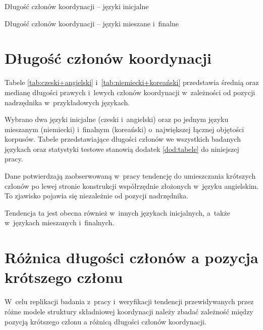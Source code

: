 

\begin{table}[H]
\centering
\resizebox{\linewidth}{!}{

\quad

}
\caption{Długość członów koordynacji -- języki inicjalne}
\label{tab:czeski+angielski}
\end{table}

\begin{table}[H]
\centering
\resizebox{\linewidth}{!}{

\quad

}
\caption{Długość członów koordynacji -- języki mieszane i~finalne}
\label{tab:niemiecki+koreański}
\end{table}

\section{Długość członów koordynacji}

Tabele \ref{tab:czeski+angielski} i~\ref{tab:niemiecki+koreański} przedstawia średnią oraz medianę długości prawych i~lewych członów koordynacji w~zależności od pozycji nadrzędnika w~przykładowych językach. 

Wybrano dwa języki inicjalne (czeski i~angielski) oraz po jednym języku mieszanym (niemiecki) i~finalnym (koreański) o~największej łącznej objętości korpusów. Tabele przedstawiające długości członów we wszystkich badanych językach oraz statystyki testowe stanowią dodatek \ref{dod:tabele} do niniejszej pracy.

Dane potwierdzają zaobserwowaną w~pracy \cite{przepiorkowski2023conjunct} tendencję do umieszczania krótszych członów po lewej stronie konstrukcji współrzędnie złożonych w~języku angielskim. To zjawisko pojawia się niezależnie od pozycji nadrzędnika.

Tendencja ta jest obecna również w~innych językach inicjalnych, a~także w~językach mieszanych i~finalnych.

\section{Różnica długości członów a pozycja krótszego członu}

W~celu replikacji badania z~pracy \cite{przepiorkowski2023conjunct} i~weryfikacji tendencji przewidywanych przez różne modele struktury składniowej koordynacji należy zbadać zależność między pozycją krótszego członu a różnicą długości członów koordynacji.

